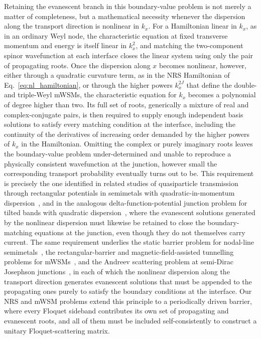\documentclass[aps,prb,onecolumn,longbibliography,nofootinbib,citeautoscript,10pt]{revtex4-2}
\begin{document}
Retaining the evanescent branch in this boundary-value problem is not merely a matter of completeness, but a mathematical necessity whenever the dispersion along the transport direction is nonlinear in $k_x$. For a Hamiltonian linear in $k_x$, as in an ordinary Weyl node, the characteristic equation at fixed transverse momentum and energy is itself linear in $k_x^2$, and matching the two-component spinor wavefunction at each interface closes the linear system using only the pair of propagating roots. Once the dispersion along $x$ becomes nonlinear, however, either through a quadratic curvature term, as in the NRS Hamiltonian of Eq.~\eqref{eq:nl_hamiltonian}, or through the higher powers $k_x^{2J}$ that define the double- and triple-Weyl mWSMs, the characteristic equation for $k_x$ becomes a polynomial of degree higher than two. Its full set of roots, generically a mixture of real and complex-conjugate pairs, is then required to supply enough independent basis solutions to satisfy every matching condition at the interface, including the continuity of the derivatives of increasing order demanded by the higher powers of $k_x$ in the Hamiltonian. Omitting the complex or purely imaginary roots leaves the boundary-value problem under-determined and unable to reproduce a physically consistent wavefunction at the junction, however small the corresponding transport probability eventually turns out to be. This requirement is precisely the one identified in related studies of quasiparticle transmission through rectangular potentials in semimetals with quadratic-in-momentum dispersion~\cite{ips-qbcp-aop}, and in the analogous delta-function-potential junction problem for tilted bands with quadratic dispersion~\cite{ips-qbcp-delta}, where the evanescent solutions generated by the nonlinear dispersion must likewise be retained to close the boundary-matching equations at the junction, even though they do not themselves carry current. The same requirement underlies the static barrier problem for nodal-line semimetals~\cite{Khokhlov2018}, the rectangular-barrier and magnetic-field-assisted tunnelling problems for mWSMs~\cite{Deng2020,ips-aritra}, and the Andreev scattering problem at semi-Dirac Josephson junctions~\cite{ips-abs-semidirac}, in each of which the nonlinear dispersion along the transport direction generates evanescent solutions that must be appended to the propagating ones purely to satisfy the boundary conditions at the interface. Our NRS and mWSM problems extend this principle to a periodically driven barrier, where every Floquet sideband contributes its own set of propagating and evanescent roots, and all of them must be included self-consistently to construct a unitary Floquet-scattering matrix.
\end{document}
